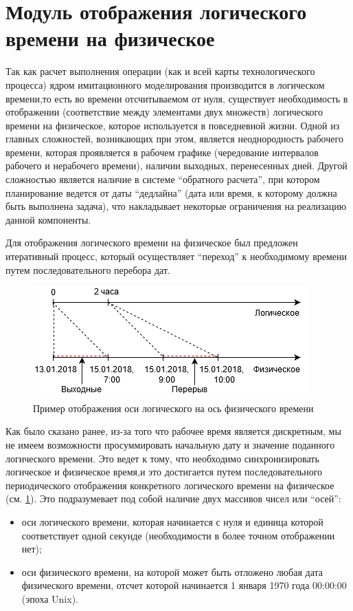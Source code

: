 \section{Модуль отображения логического времени на физическое}
\indent Так как расчет выполнения операции (как и всей карты технологического процесса) ядром имитационного моделирования производится в логическом времени,то есть во времени отсчитываемом от нуля, существует необходимость в отображении (соответствие между элементами двух множеств) логического времени на физическое, которое используется в повседневной жизни.
Одной из главных сложностей, возникающих при этом, является неоднородность рабочего времени, которая проявляется в рабочем графике (чередование интервалов рабочего и нерабочего времени), наличии выходных, перенесенных дней.
Другой сложностью является наличие в системе ``обратного расчета'', при котором планирование ведется от даты ``дедлайна'' (дата или время, к которому должна быть выполнена задача), что накладывает некоторые ограничения на реализацию данной компоненты.

\indent Для отображения логического времени на физическое был предложен итеративный процесс, который осуществляет ``переход'' к необходимому времени путем последовательного перебора дат.

\begin{figure}[ht]
	\centering
	\includegraphics[width=0.7\linewidth]{pics/scheduleAxes.png}
	\caption{Пример отображения оси логического на ось физического времени}
	\label{fig:axes}
\end{figure}

\indent Как было сказано ранее, из-за того что рабочее время является дискретным, мы не имеем возможности просуммировать начальную дату и значение поданного логического времени.
Это ведет к тому, что необходимо синхронизировать логическое и физическое время,и это достигается путем последовательного периодического отображения конкретного логического времени на физическое (см. \ref{fig:axes}).
Это подразумевает под собой наличие двух массивов чисел или ``осей'':

\begin{itemize}
	\item оси логического времени, которая начинается с нуля и единица которой соответствует одной секунде (необходимости в более точном отображении нет);
	\item оси физического времени, на которой может быть отложено любая дата физического времени, отсчет которой начинается 1 января 1970 года 00:00:00 (эпоха Unix).
\end{itemize}

